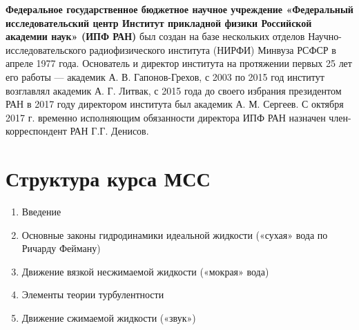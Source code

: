 \textbf{Федеральное государственное бюджетное научное учреждение «Федеральный исследовательский центр Институт прикладной физики Российской академии наук» (ИПФ РАН)} был создан на базе нескольких отделов Научно-исследовательского радиофизического института (НИРФИ) Минвуза РСФСР в апреле 1977 года. Основатель и директор института на протяжении первых 25 лет его работы — академик А. В. Гапонов-Грехов, с 2003 по 2015 год институт возглавлял академик А. Г. Литвак, с 2015 года до своего избрания президентом РАН в 2017 году директором института был академик А. М. Сергеев. С октября 2017 г. временно исполняющим обязанности директора ИПФ РАН назначен член-корреспондент РАН Г.Г. Денисов.
\section{Структура курса МСС}
\begin{enumerate}
	\item Введение
	\item Основные законы гидродинамики идеальной жидкости («сухая» вода по Ричарду Фейману)
	\item Движение вязкой несжимаемой жидкости («мокрая» вода)
	\item Элементы теории турбулентности
	\item Движение сжимаемой жидкости («звук»)
\end{enumerate}
